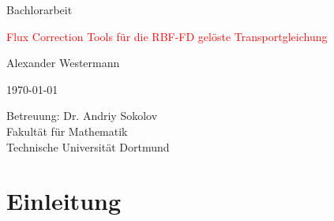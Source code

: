 \documentclass[a4paper,11pt]{article}
\begin{document}
  \begin{titlepage}
\empty
    \begin{center} \large 
    {\huge Bachlorarbeit}
    \vspace*{2cm}

    {\huge \textcolor{red}{Flux Correction Tools für die RBF-FD gelöste Transportgleichung}}
    \vspace*{2.5cm}

    Alexander Westermann
    \vspace*{1.5cm}

    \today
    \vspace*{3.5cm}


    Betreuung: Dr. Andriy Sokolov \\[1cm]
    Fakultät für Mathematik \\[1cm]
		Technische Universität Dortmund\\[3cm]   
    \end{center}
  \end{titlepage}
\pagebreak
{}
 \tableofcontents
\pagebreak
\listoffigures
\pagebreak
{}
\setcounter{page}{1}
\section{Einleitung}
\pagebreak
\end{document}
